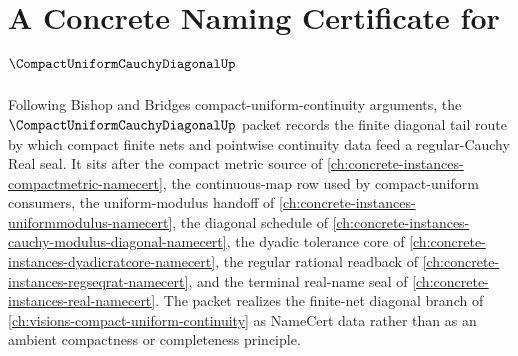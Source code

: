 \chapter{A Concrete Naming Certificate for $\CompactUniformCauchyDiagonalUp$}
\label{ch:concrete-instances-compact-uniform-cauchy-diagonal-namecert}

Following Bishop and Bridges compact-uniform-continuity arguments, the $\CompactUniformCauchyDiagonalUp$ packet records the finite diagonal tail route by which compact finite nets and pointwise continuity data feed a regular-Cauchy Real seal. It sits after the compact metric source of \autoref{ch:concrete-instances-compactmetric-namecert}, the continuous-map row used by compact-uniform consumers, the uniform-modulus handoff of \autoref{ch:concrete-instances-uniformmodulus-namecert}, the diagonal schedule of \autoref{ch:concrete-instances-cauchy-modulus-diagonal-namecert}, the dyadic tolerance core of \autoref{ch:concrete-instances-dyadicratcore-namecert}, the regular rational readback of \autoref{ch:concrete-instances-regseqrat-namecert}, and the terminal real-name seal of \autoref{ch:concrete-instances-real-namecert}. The packet realizes the finite-net diagonal branch of \autoref{ch:visions-compact-uniform-continuity} as NameCert data rather than as an ambient compactness or completeness principle.

